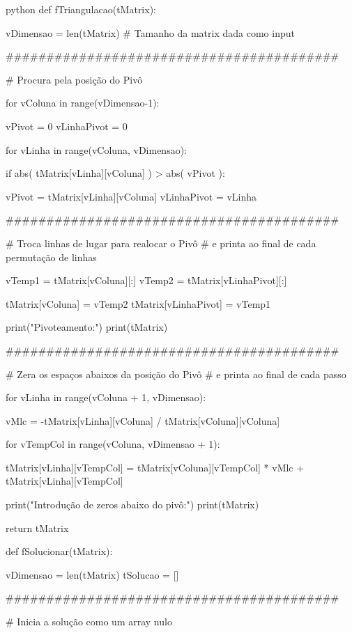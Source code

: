 \documentclass[twoside]{amsart}
\numberwithin{equation}{section}
\begin{document}
\begin{mintedbox}{python}
def fTriangulacao(tMatrix):

    vDimensao = len(tMatrix) # Tamanho da matrix dada como input

    #########################################

    # Procura pela posição do Pivô

    for vColuna in range(vDimensao-1):

        vPivot = 0 
        vLinhaPivot = 0 

        for vLinha in range(vColuna, vDimensao): 

            if abs( tMatrix[vLinha][vColuna] ) > abs( vPivot ):

                vPivot = tMatrix[vLinha][vColuna]
                vLinhaPivot = vLinha

    #########################################

    # Troca linhas de lugar para realocar o Pivô
    # e printa ao final de cada permutação de linhas

        vTemp1 = tMatrix[vColuna][:]
        vTemp2 = tMatrix[vLinhaPivot][:]

        tMatrix[vColuna] = vTemp2
        tMatrix[vLinhaPivot] = vTemp1

        print("Pivoteamento:")
        print(tMatrix)

    #########################################

    # Zera os espaços abaixos da posição do Pivô
    # e printa ao final de cada passo

        for vLinha in range(vColuna + 1, vDimensao):

            vMlc = -tMatrix[vLinha][vColuna] / tMatrix[vColuna][vColuna]

            for vTempCol in range(vColuna, vDimensao + 1):

                tMatrix[vLinha][vTempCol] = tMatrix[vColuna][vTempCol] * vMlc + tMatrix[vLinha][vTempCol]

            print("Introdução de zeros abaixo do pivô:")
            print(tMatrix)

    return tMatrix

def fSolucionar(tMatrix):

    vDimensao = len(tMatrix)
    tSolucao = []

    #########################################

    # Inicia a solução como um array nulo


\end{mintedbox}
\end{document}
